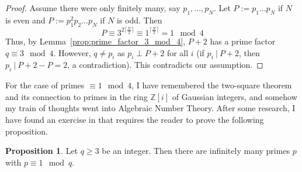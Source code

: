 \documentclass{scrartcl}
\newcommand{\Z}{\mathbb{Z}}
\newcommand{\divides}{\ | \ }
\theoremstyle{definition}
\newtheorem{proposition}[definition]{Proposition}
\begin{document}
\begin{proof}
    Assume there were only finitely many, say $p_1, ..., p_N$.
    Let $P := p_1 ... p_N$ if $N$ is even and $P := p_1^2 p_2 ... p_N$ if $N$ is odd.
    Then
    \begin{equation*}
        P \equiv 3^{2 \lceil \frac N 2 \rceil} \equiv 1^{\lceil \frac N 2 \rceil} = 1 \mod 4
    \end{equation*}
    Thus, by Lemma~\ref{prop:prime_factor_3_mod_4}, $P + 2$ has a prime factor $q \equiv 3 \mod 4$.
    However, $q \neq p_i$ as $p_i \perp P + 2$ for all $i$ (if $p_i \divides P + 2$, then $p_i \divides P + 2 - P = 2$, a contradiction).
    This contradicts our assumption.
\end{proof}
For the case of primes $\equiv 1 \mod 4$, I have remembered the two-square theorem and its connection to primes in the ring $\Z[i]$ of Gaussian integers, and somehow my train of thoughts went into Algebraic Number Theory.
After some research, I have found an exercise in \cite[Chapter I, §10]{neukirch} that requires the reader to prove the following proposition.
\begin{proposition}
    \label{prop:primes_1_mod_q}
    Let $q \geq 3$ be an integer.
    Then there are infinitely many primes $p$ with $p \equiv 1 \mod q$.
\end{proposition}
\end{document}
